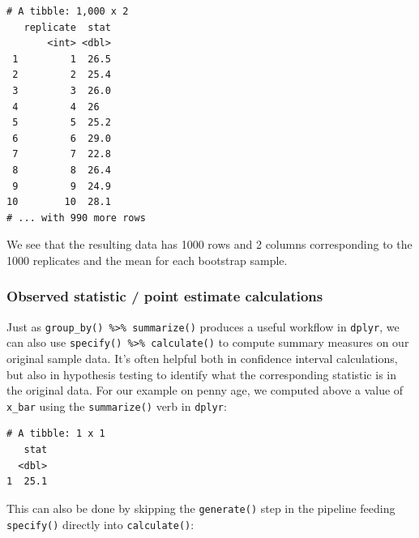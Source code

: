 \documentclass[12pt,]{krantz}
\makeatletter
\newenvironment{Shaded}{\begin{snugshade}}{\end{snugshade}}
\newcommand{\KeywordTok}[1]{\textcolor[rgb]{0.27,0.27,0.27}{\textbf{#1}}}
\newcommand{\DataTypeTok}[1]{\textcolor[rgb]{0.27,0.27,0.27}{#1}}
\newcommand{\DecValTok}[1]{\textcolor[rgb]{0.06,0.06,0.06}{#1}}
\newcommand{\StringTok}[1]{\textcolor[rgb]{0.5,0.5,0.5}{#1}}
\newcommand{\OperatorTok}[1]{\textcolor[rgb]{0.43,0.43,0.43}{\textbf{#1}}}
\newcommand{\NormalTok}[1]{#1}
\newenvironment{kframe}{%
\medskip{}
\setlength{\fboxsep}{.8em}
 \def\at@end@of@kframe{}%
 \ifinner\ifhmode%
  \def\at@end@of@kframe{\end{minipage}}%
  \begin{minipage}{\columnwidth}%
 \fi\fi%
 \def\FrameCommand##1{\hskip\@totalleftmargin \hskip-\fboxsep
 \colorbox{shadecolor}{##1}\hskip-\fboxsep
     \hskip-\linewidth \hskip-\@totalleftmargin \hskip\columnwidth}%
 \MakeFramed {\advance\hsize-\width
   \@totalleftmargin\z@ \linewidth\hsize
   \@setminipage}}%
 {\par\unskip\endMakeFramed%
 \at@end@of@kframe}
\renewenvironment{Shaded}{\begin{kframe}}{\end{kframe}}
\makeatother
\begin{document}
\begin{verbatim}
# A tibble: 1,000 x 2
   replicate  stat
       <int> <dbl>
 1         1  26.5
 2         2  25.4
 3         3  26.0
 4         4  26  
 5         5  25.2
 6         6  29.0
 7         7  22.8
 8         8  26.4
 9         9  24.9
10        10  28.1
# ... with 990 more rows
\end{verbatim}

We see that the resulting data has 1000 rows and 2 columns corresponding
to the 1000 replicates and the mean for each bootstrap sample.

\subsubsection*{Observed statistic / point estimate
calculations}\label{observed-statistic-point-estimate-calculations}

Just as \texttt{group\_by()\ \%\textgreater{}\%\ summarize()} produces a
useful workflow in \texttt{dplyr}, we can also use
\texttt{specify()\ \%\textgreater{}\%\ calculate()} to compute summary
measures on our original sample data. It's often helpful both in
confidence interval calculations, but also in hypothesis testing to
identify what the corresponding statistic is in the original data. For
our example on penny age, we computed above a value of \texttt{x\_bar}
using the \texttt{summarize()} verb in \texttt{dplyr}:

\begin{Shaded}
\end{Shaded}

\begin{verbatim}
# A tibble: 1 x 1
   stat
  <dbl>
1  25.1
\end{verbatim}

This can also be done by skipping the \texttt{generate()} step in the
pipeline feeding \texttt{specify()} directly into \texttt{calculate()}:

\begin{Shaded}
\end{Shaded}
\end{document}
